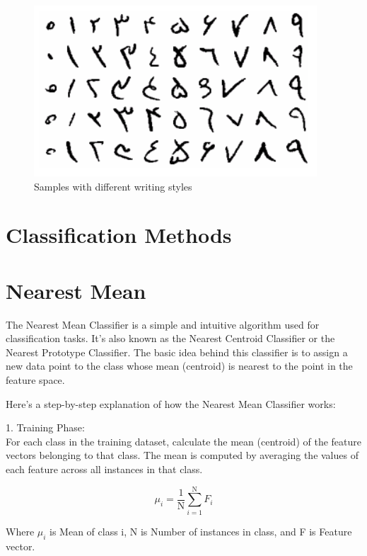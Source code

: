 \documentclass[9pt,twocolumn]{paper-template}
\begin{document}
\begin{figure}[h!]
	\centering
	\includegraphics[width=\linewidth]{figures/screenshot001}
	\caption{Samples with different writing styles}
	\label{fig:frog}
\end{figure}

\newpage

\section*{Classification Methods}


\section*{Nearest Mean}



The Nearest Mean Classifier is a simple and intuitive algorithm used for classification tasks. It's also known as the Nearest Centroid Classifier or the Nearest Prototype Classifier. The basic idea behind this classifier is to assign a new data point to the class whose mean (centroid) is nearest to the point in the feature space.

Here's a step-by-step explanation of how the Nearest Mean Classifier works:

1. Training Phase:\\
For each class in the training dataset, calculate the mean (centroid) of the feature vectors belonging to that class. The mean is computed by averaging the values of each feature across all instances in that class.

\[ \mu_i = \frac{1}{\text{N}} \sum_{i=1}^{\text{N}} F_i \]

Where $\mu_i$ is Mean of class i, N is Number of instances in class, and F is Feature vector.
\end{document}
